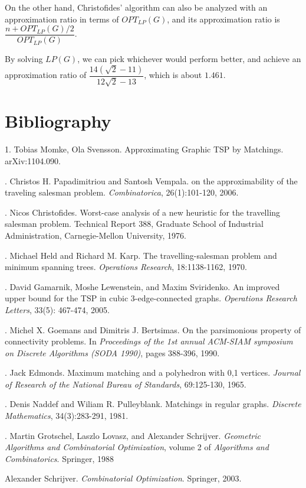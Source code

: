 \documentclass[12pt]{article}
\begin{document}
On the other hand, Christofides' algorithm can also be analyzed with an
approximation ratio in terms of $OPT_{LP}(G)$, and its approximation ratio is
$\dfrac{n + OPT_{LP}(G)/2}{OPT_{LP}(G)}$.

By solving $LP(G)$, we can pick whichever would perform better, and achieve an
approximation ratio of $\dfrac{14(\sqrt{2} - 11)}{12\sqrt{2} - 13}$, which is
about $1.461$.

\section{Bibliography}

1. Tobias Momke, Ola Svensson. Approximating Graphic TSP by Matchings. arXiv:1104.090.

. Christos H. Papadimitriou and Santosh Vempala. on the approximability of the traveling salesman problem. \emph{Combinatorica}, 26(1):101-120, 2006.

. Nicos Christofides. Worst-case analysis of a new heuristic for the travelling salesman problem. Technical Report 388, Graduate School of Industrial  Administration, Carnegie-Mellon University, 1976.

. Michael Held and Richard M. Karp. The travelling-salesman problem and minimum spanning trees. \emph{Operations Research}, 18:1138-1162, 1970.

. David Gamarnik, Moshe Lewenstein, and Maxim Sviridenko. An improved upper bound for the TSP in cubic 3-edge-connected graphs. \emph{Operations Research Letters}, 33(5): 467-474, 2005.

. Michel X. Goemans and Dimitris J. Bertsimas. On the parsimonious property of connectivity problems. In \emph{Proceedings of the 1st annual ACM-SIAM symposium on Discrete Algorithms (SODA 1990)}, pages 388-396, 1990.

. Jack Edmonds. Maximum matching and a polyhedron with 0,1 vertices. \emph {Journal of Research of the National Bureau of Standards}, 69:125-130, 1965.

. Denis Naddef and Wiliam R. Pulleyblank. Matchings in regular graphs. \emph{Discrete Mathematics}, 34(3):283-291, 1981.

. Martin Grotschel, Laszlo Lovasz, and Alexander Schrijver. \emph{Geometric Algorithms and Combinatorial Optimization}, volume 2 of \emph{Algorithms and Combinatorics}. Springer, 1988

\noindent
Alexander Schrijver. \emph{Combinatorial Optimization}. Springer, 2003.

%
%
\end{document}
